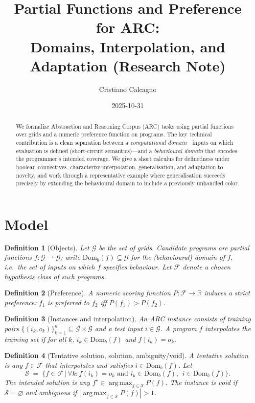\documentclass[11pt]{article}
\title{Partial Functions and Preference for ARC:\\
Domains, Interpolation, and Adaptation (Research Note)}
\author{Cristiano Calcagno}
\date{2025-10-31}
\newtheorem{definition}{Definition}
\newcommand{\G}{\mathcal{G}}
\newcommand{\F}{\mathcal{F}}
\newcommand{\Domb}{\mathrm{Dom}_b}
\DeclareMathOperator*{\argmax}{arg\,max}
\begin{document}
\maketitle

\begin{abstract}
We formalize Abstraction and Reasoning Corpus (ARC) tasks using partial functions over grids and a numeric preference function on programs. The key technical contribution is a clean separation between a \emph{computational domain}---inputs on which evaluation is defined (short-circuit semantics)---and a \emph{behavioural domain} that encodes the programmer's intended coverage. We give a short calculus for definedness under boolean connectives, characterize interpolation, generalisation, and adaptation to novelty, and work through a representative example where generalisation succeeds precisely by extending the behavioural domain to include a previously unhandled color.
\end{abstract}

\section{Model}

\begin{definition}[Objects]
Let $\G$ be the set of grids. Candidate programs are partial functions $f:\G\rightharpoonup \G$; write $\Domb(f)\subseteq \G$ for the (behavioural) domain of $f$, i.e.\ the set of inputs on which $f$ \emph{specifies} behaviour. Let $\F$ denote a chosen hypothesis class of such programs.
\end{definition}

\begin{definition}[Preference]
A numeric scoring function $P:\F\to\mathbb{R}$ induces a strict preference: $f_1$ is preferred to $f_2$ iff $P(f_1)>P(f_2)$.
\end{definition}

\begin{definition}[Instances and interpolation]
An ARC instance consists of training pairs $\{(i_k,o_k)\}_{k=1}^n\subseteq \G\times\G$ and a test input $i\in\G$. A program $f$ \emph{interpolates} the training set if for all $k$, $i_k\in\Domb(f)$ and $f(i_k)=o_k$.
\end{definition}

\begin{definition}[Tentative solution, solution, ambiguity/void]
A \emph{tentative solution} is any $f\in\F$ that interpolates and satisfies $i\in\Domb(f)$. Let
\[
\mathcal{S} \;=\; \bigl\{ f\in\F \,\big|\, \forall k: f(i_k)=o_k \text{ and } i_k\in\Domb(f), \ \ i\in\Domb(f)\bigr\}.
\]
The \emph{intended solution} is any $f^\star\in \argmax_{f\in\mathcal{S}} P(f)$. The instance is \emph{void} if $\mathcal{S}=\varnothing$ and \emph{ambiguous} if $|\argmax_{f\in\mathcal{S}} P(f)|>1$.
\end{definition}
\end{document}
